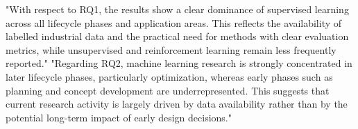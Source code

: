 "With respect to RQ1, the results show a clear dominance of supervised learning across all lifecycle phases and application areas. This reflects the availability of labelled industrial data and the practical need for methods with clear evaluation metrics, while unsupervised and reinforcement learning remain less frequently reported."
"Regarding RQ2, machine learning research is strongly concentrated in later lifecycle phases, particularly optimization, whereas early phases such as planning and concept development are underrepresented. This suggests that current research activity is largely driven by data availability rather than by the potential long-term impact of early design decisions."

